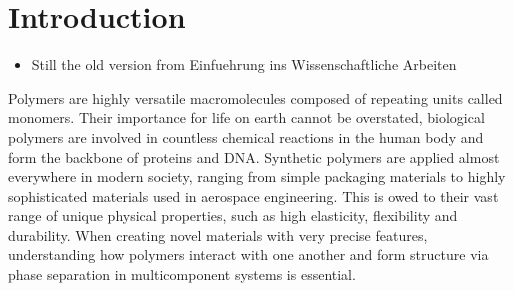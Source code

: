 \documentclass[bachelor,       %
               oneside,        %
               BCOR10mm,       %
               ngerman, english %
               ]{GAUBM}
\begin{document}
\chapter{Introduction}
\begin{itemize}
    \item Still the old version from Einfuehrung ins Wissenschaftliche Arbeiten
\end{itemize}
Polymers are highly versatile macromolecules composed of repeating units called monomers. Their importance for life on earth cannot be overstated, biological polymers are involved in countless chemical reactions in the human body and form the backbone of proteins and DNA. Synthetic polymers are applied almost everywhere in modern society, ranging from simple packaging materials to highly sophisticated materials used in aerospace engineering. This is owed to their vast range of unique physical properties, such as high elasticity, flexibility and durability. When creating novel materials with very precise features, understanding how polymers interact with one another and form structure via phase separation in multicomponent systems is essential.\\
\end{document}
